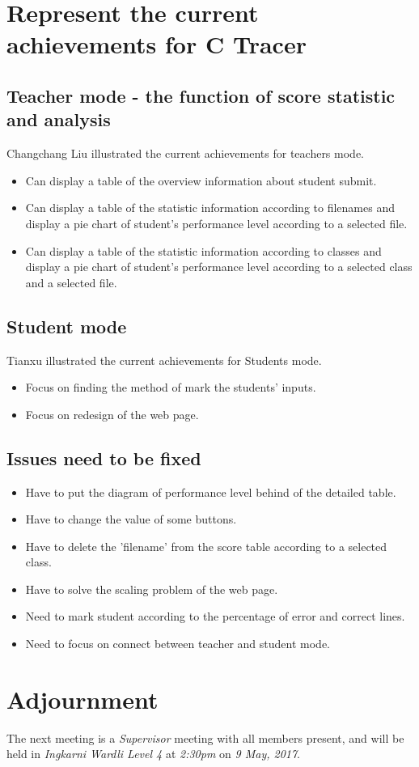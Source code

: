 \documentclass[11pt, a4paper]{article}
\begin{document}
\section{Represent the current achievements for C Tracer}
\subsection{Teacher mode - the function of score statistic and analysis}
Changchang Liu illustrated the current achievements for teachers mode.
\begin{itemize}
\item Can display a table of the overview information about student submit.
\item Can display a table of the statistic information according to filenames and display a pie chart of student’s performance level according to a selected file.
\item Can display a table of the statistic information according to classes and display a pie chart of student’s performance level according to a selected class and a selected file.

\end{itemize}
\subsection{Student mode}
Tianxu illustrated the current achievements for Students mode.
\begin{itemize}
\item Focus on finding the method of mark the students' inputs.
\item Focus on redesign of the web page.
\end{itemize}

\subsection{Issues need to be fixed}
\begin{itemize}
\item Have to put the diagram of performance level behind of the detailed table.
\item Have to change the value of some buttons.
\item Have to delete the 'filename' from the score table according to a selected class.
\item Have to solve the scaling problem of the web page.
\item Need to mark student according to the percentage of error and correct lines.
\item Need to focus on connect between teacher and student mode.
\end{itemize}



\section{Adjournment}
The next meeting is a \emph{Supervisor} meeting with all members present, and will be held in \emph{Ingkarni Wardli Level 4} at \emph{2:30pm} on \emph{9 May, 2017}.
\end{document}
